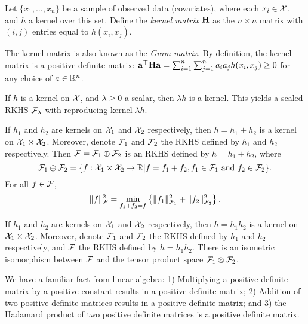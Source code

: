 \begin{definition}
  Let $\{x_1,\dots,x_n\}$ be a sample of observed data (covariates), where each $x_i\in{\mathcal X}$, and $h$ a kernel over this set.
  Define the \emph{kernel matrix} ${\mathbf H}$ as the $n \times n$ matrix with $(i,j)$ entries equal to $h(x_i,x_j)$.
\end{definition}

The kernel matrix is also known as the \emph{Gram matrix}.
By definition, the kernel matrix is a positive-definite matrix: ${\mathbf a}^\top{\mathbf H}{\mathbf a} = \sum_{i=1}^n\sum_{j=1}^n a_ia_jh(x_i,x_j) \geq 0$ for any choice of $a\in\mathbb{R}^n$.

\begin{lemma}
  If $h$ is a kernel on ${\mathcal X}$, and $\lambda \geq 0$ a scalar, then $\lambda h$ is a kernel.
  This yields a scaled RKHS ${\mathcal F}_\lambda$ with reproducing kernel $\lambda h$.
\end{lemma}

\begin{lemma}
  If $h_1$ and $h_2$ are kernels on ${\mathcal X}_1$ and ${\mathcal X}_2$ respectively, then $h = h_1 + h_2$ is a kernel on ${\mathcal X}_1 \times {\mathcal X}_2$.
  Moreover, denote ${\mathcal F}_1$ and ${\mathcal F}_2$ the RKHS defined by $h_1$ and $h_2$ respectively.
  Then ${\mathcal F} = {\mathcal F}_1 \oplus {\mathcal F}_2$ is an RKHS defined by $h = h_1 + h_2$, where
  \[
    {\mathcal F}_1 \oplus {\mathcal F}_2 = \{ f:{\mathcal X}_1\times{\mathcal X}_2 \to\mathbb{R} | f = f_1 + f_2, f_1\in{\mathcal F}_1 \text{ and } f_2\in{\mathcal F}_2 \}.
  \]
  For all $f\in{\mathcal F}$,
  \[
    \lVert f\rVert_{\mathcal F}^2 = \min_{f_1+f_2=f} \left\{ \lVert f_1\rVert_{{\mathcal F}_1}^2 + \lVert f_2\rVert_{{\mathcal F}_2}^2 \right\}.
  \]
\end{lemma}

\begin{lemma}
  If $h_1$ and $h_2$ are kernels on ${\mathcal X}_1$ and ${\mathcal X}_2$ respectively, then $h = h_1 h_2$ is a kernel on ${\mathcal X}_1 \times {\mathcal X}_2$.
  Moreover, denote ${\mathcal F}_1$ and ${\mathcal F}_2$ the RKHS defined by $h_1$ and $h_2$ respectively, and ${\mathcal F}$ the RKHS defined by $h = h_1 h_2$.
  There is an isometric isomorphism between ${\mathcal F}$ and the tensor product space ${\mathcal F}_1 \otimes {\mathcal F}_2$.
\end{lemma}

We have a familiar fact from linear algebra: 1) Multiplying a positive definite matrix by a positive constant results in a positive definite matrix; 2) Addition of two positive definite matrices results in a positive definite matrix; and 3) the Hadamard product of two positive definite matrices is a positive definite matrix.

